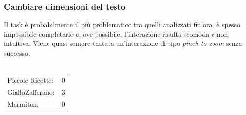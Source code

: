 \subsubsection{Cambiare dimensioni del testo}
Il task è probabilmente il più problematico tra quelli analizzati fin'ora, è spesso impossibile
completarlo e, ove possibile, l'interazione risulta
scomoda e non intuitiva.  Viene quasi sempre tentata
un'interazione di tipo \emph{pinch to zoom} senza successo.\\\\
\begin{tabular}{l c}
Piccole Ricette: & 0\\
GialloZafferano: & 3\\
Marmiton: & 0\\
\end{tabular}
